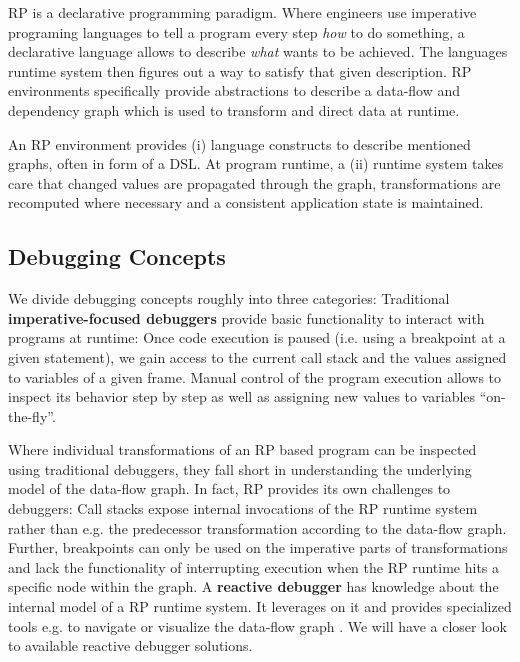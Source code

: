 \documentclass[12pt,a4paper]{article}
\begin{document}
RP is a declarative programming paradigm. Where engineers use imperative programing languages to tell a program every step \emph{how} to do something, a declarative language allows to describe \emph{what} wants to be achieved. The languages runtime system then figures out a way to satisfy that given description. RP environments specifically provide abstractions to describe a data-flow and dependency graph which is used to transform and direct data at runtime.

An RP environment provides (i) language constructs to describe mentioned graphs, often in form of a DSL\cite{10.1145/2577080.2577083}. At program runtime, a (ii) runtime system takes care that changed values are propagated through the graph, transformations are recomputed where necessary and a consistent application state is maintained.

\subsection{Debugging Concepts}

We divide debugging concepts roughly into three categories: Traditional \textbf{imperative-focused debuggers} provide basic functionality to interact with programs at runtime: Once code execution is paused (i.e. using a breakpoint at a given statement), we gain access to the current call stack and the values assigned to variables of a given frame. Manual control of the program execution allows to inspect its behavior step by step as well as assigning new values to variables ``on-the-fly''.

Where individual transformations of an RP based program can be inspected using traditional debuggers, they fall short in understanding the underlying model of the data-flow graph. In fact, RP provides its own challenges to debuggers: Call stacks expose internal invocations of the RP runtime system rather than e.g. the predecessor transformation according to the data-flow graph. Further, breakpoints can only be used on the imperative parts of transformations and lack the functionality of interrupting execution when the RP runtime hits a specific node within the graph. A \textbf{reactive debugger} has knowledge about the internal model of a RP runtime system. It leverages on it and provides specialized tools e.g. to navigate or visualize the data-flow graph \cite{10.1145/2884781.2884815} \cite{10.1145/3180155.3180156} \cite{rxviz}. We will have a closer look to available reactive debugger solutions.
\end{document}
